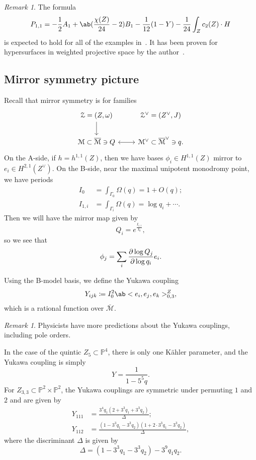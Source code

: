 \documentclass[10pt]{amsart}
\theoremstyle{definition}
\theoremstyle{remark}
\newtheorem{rmk}[thm]{Remark}
\theoremstyle{plain}
\theoremstyle{definition}
\theoremstyle{remark}
\renewcommand{\P}{\mathbb{P}}
\newcommand{\M}{\mathcal{M}}
\newcommand{\Mbar}{\overline{\mathcal{M}}}
\newcommand{\mc}[1]{\mathcal{#1}}
\newcommand{\1}{\mathbf{1}}
\newcommand{\2}{\mathbf{2}}
\newcommand{\3}{\mathbf{3}}
\begin{document}
\begin{rmk}
    The formula
    \[ P_{1,1} = -\frac{1}{2} A_1 + \ab(\frac{\chi(Z)}{24} -2) B_1 - \frac{1}{12}(1-Y) - \frac{1}{24} \int_Z c_2(Z) \cdot H \]
    is expected to hold for all of the examples in~. It has been proven for hypersurfaces in weighted projective space by the author~\cite{polynomiality}.
\end{rmk}


\subsection{Mirror symmetry picture}%
\label{sub:Mirror symmetry picture}

Recall that mirror symmetry is for families
\begin{equation*}
\begin{tikzcd}
    \mc{Z} = (Z,\omega) \ar{d} & \mc{Z}^{\vee} = (Z^{\vee}, J) \\
    \mc{M} \subset \Mbar \ni Q \ar[leftrightarrow]{r} & \M^{\vee} \subset \Mbar^{\vee} \ni q.
\end{tikzcd}
\end{equation*}
On the A-side, if $h = h^{1,1}(Z)$, then we have bases $\phi_i \in H^{1,1}(Z)$ mirror to $e_i \in H^{2,1}(Z^{\vee})$. On the B-side, near the maximal unipotent monodromy point, we have periods
\begin{align*}
    I_0 &= \int_{\Gamma_0} \Omega(q) = 1 + O(q); \\
    I_{1,i} &= \int_{\Gamma_i} \Omega(q) = \log q_i + \cdots.
\end{align*}
Then we will have the mirror map given by
\[ Q_i = e^{\frac{I_{1,i}}{I_0}}, \]
so we see that
\[ \phi_j = \sum_i \pdv{\log Q_j}{\log q_i} e_i. \]

Using the B-model basis, we define the Yukawa coupling
\[ Y_{ijk} \coloneqq I_0^2 \ab<e_i, e_j, e_k>_{0,3}^Z, \]
which is a rational function over $\bar{\M}$.

\begin{rmk}
    Physicists have more predictions about the Yukawa couplings, including pole orders.
\end{rmk}

In the case of the quintic $Z_5 \subset \P^4$, there is only one K\"ahler parameter, and the Yukawa coupling is simply
\[ Y = \frac{1}{1-5^5 q}. \]
For $Z_{3,3} \subset \P^2 \times \P^2$, the Yukawa couplings are symmetric under permuting $1$ and $2$ and are given by
\begin{align*}
    Y_{111} &= \frac{3^4 q_1 (2+3^3 q_1 + 3^3 q_2)}{\Delta}; \\
    Y_{112} &= \frac{(1-3^3 q_1 - 3^3 q_2)(1+2 \cdot 3^3 q_1 - 3^3 q_2)}{\Delta},
\end{align*}
where the discriminant $\Delta$ is given by
\[ \Delta = (1-3^3 q_1 - 3^3 q_2) - 3^9 q_1 q_2. \]
\end{document}
